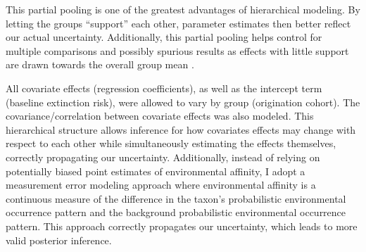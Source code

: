 \documentclass[12pt,letterpaper]{article}
\begin{document}
This partial pooling is one of the greatest advantages of hierarchical modeling. By letting the groups ``support'' each other, parameter estimates then better reflect our actual uncertainty. Additionally, this partial pooling helps control for multiple comparisons and possibly spurious results as effects with little support are drawn towards the overall group mean \citep{Gelman2013d,Gelman2007}. 

All covariate effects (regression coefficients), as well as the intercept term (baseline extinction risk), were allowed to vary by group (origination cohort). The covariance/correlation between covariate effects was also modeled. This hierarchical structure allows inference for how covariates effects may change with respect to each other while simultaneously estimating the effects themselves, correctly propagating our uncertainty. Additionally, instead of relying on potentially biased point estimates of environmental affinity, I adopt a measurement error modeling approach where environmental affinity is a continuous measure of the difference in the taxon's probabilistic environmental occurrence pattern and the background probabilistic environmental occurrence pattern. This approach correctly propagates our uncertainty, which leads to more valid posterior inference. 
\end{document}
